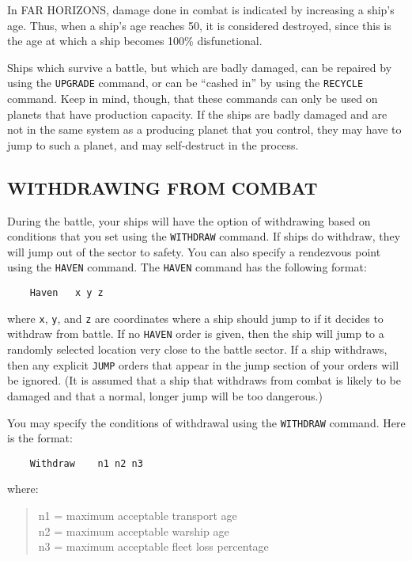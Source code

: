 \documentclass[10pt,titlepage]{article}
\begin{document}
In FAR HORIZONS, damage done in combat is indicated by increasing a ship's age.
Thus, when a ship's age reaches 50, it is considered destroyed, since this is
the age at which a ship becomes 100\% disfunctional.

Ships which survive a battle, but which are badly damaged, can be repaired by
using the \texttt{UPGRADE} command, or can be ``cashed in'' by using the \texttt{RECYCLE} command.
Keep in mind, though, that these commands can only be used on planets that have
production capacity.  If the ships are badly damaged and are not in the same
system as a producing planet that you control, they may have to jump to such
a planet, and may self-destruct in the process.


\subsection{WITHDRAWING FROM COMBAT}
\label{sec:withdrawingfromcombat}


During the battle, your ships will have the option of withdrawing based on
conditions that you set using the \texttt{WITHDRAW} command.  If ships do withdraw, they
will jump out of the sector to safety.  You can also specify a rendezvous
point using the \texttt{HAVEN} command.  The \texttt{HAVEN} command has the following format:

\begin{verbatim}
	Haven	x y z\end{verbatim} 

where \texttt{x}, \texttt{y}, and \texttt{z} are coordinates where a ship should jump to if it
decides to withdraw from battle.  If no \texttt{HAVEN} order is given, then the ship
will jump to a randomly selected location very close to the battle sector.
If a ship withdraws, then any explicit \texttt{JUMP} orders that appear in the jump
section of your orders will be ignored.  (It is assumed that a ship that
withdraws from combat is likely to be damaged and that a normal, longer jump
will be too dangerous.)

You may specify the conditions of withdrawal using the \texttt{WITHDRAW} command.  Here
is the format:

\begin{verbatim}
	Withdraw	n1 n2 n3
\end{verbatim} 

where:
\begin{quotation}
		\noindent n1 = maximum acceptable transport age \\
		n2 = maximum acceptable warship age \\
		n3 = maximum acceptable fleet loss percentage \\
\end{quotation} 
\end{document}

